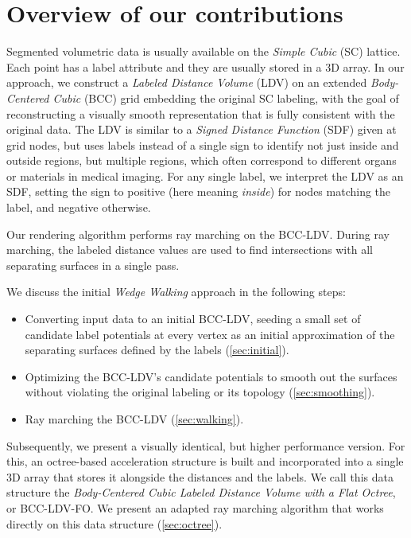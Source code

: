 \documentclass[journal]{vgtc}                     %
\begin{document}


\section{Overview of our contributions}
Segmented volumetric data is usually available on the \emph{Simple Cubic} (SC) lattice. Each point has a label attribute and they are usually stored in a 3D array.
In our approach, we construct a \emph{Labeled Distance Volume} (LDV) on an extended \emph{Body-Centered Cubic} (BCC) grid embedding the original SC labeling, with the goal of reconstructing a visually smooth representation that is fully consistent with the original data. The LDV is similar to a \emph{Signed Distance Function} (SDF) given at grid nodes, but uses labels instead of a single sign to identify not just inside and outside regions, but multiple regions, which often correspond to different organs or materials in medical imaging. For any single label, we interpret the LDV as an SDF, setting the sign to positive (here meaning \emph{inside}) for nodes matching the label, and negative otherwise.

Our rendering algorithm performs ray marching on the BCC-LDV. During ray marching, the labeled distance values are used to find intersections with all separating surfaces in a single pass. 

We discuss the initial \emph{Wedge Walking} approach in the following steps:
\begin{itemize}
	\item Converting input data to an initial BCC-LDV, seeding a small set of candidate label potentials at every vertex as an initial approximation of the separating surfaces defined by the labels (\cref{sec:initial}).
	\item Optimizing the BCC-LDV's candidate potentials to smooth out the surfaces without violating the original labeling or its topology (\cref{sec:smoothing}).
	\item Ray marching the BCC-LDV (\cref{sec:walking}).
\end{itemize}

Subsequently, we present a visually identical, but higher performance version. For this, an octree-based acceleration structure is built and incorporated into a single 3D array that stores it alongside the distances and the labels. We call this data structure the \emph{Body-Centered Cubic Labeled Distance Volume with a Flat Octree}, or BCC-LDV-FO. We present an adapted ray marching algorithm that works directly on this data structure (\cref{sec:octree}).
\end{document}
